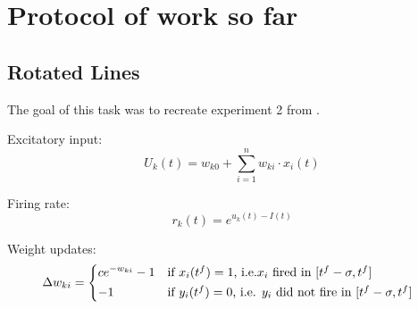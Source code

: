 \chapter{Protocol of work so far}

\section{Rotated Lines}

The goal of this task was to recreate experiment 2 from \citet{nessler}. 

Excitatory input:
\begin{equation}
\label{eqn:uk}
U_k(t) = w_{k0} + \sum_{i=1}^n w_{ki} \cdot x_i(t)
\end{equation}

Firing rate:
\begin{equation}
\label{eqn:rk}
r_k(t) = e^{u_k(t) - I(t)}
\end{equation}

Weight updates:
\begin{equation}
\Delta w_{ki} = \begin{dcases*} ce^{-w_{ki}} - 1 & if $x_{i}(t^f) = 1$, i.e.$x_{i}$ fired in $ [t^f - \sigma, t^f] $ \\
-1 & \text{if $ y_i(t^f) = 0 $, i.e. $ y_i $ did not fire in $ [t^f - \sigma, t^f] $ } \end{dcases*}
\end{equation}